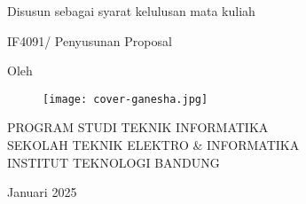 \clearpage
\pagestyle{empty}

\begin{center}
    \smallskip

    \Large \bfseries \MakeUppercase{\thetitle}
    \vfill


    \large Disusun sebagai syarat kelulusan mata kuliah

    \large IF4091/ Penyusunan Proposal
    \vfill

    \large Oleh

    \Large \theauthor

    \vfill
    \begin{figure}[H]
        \centering
        \texttt{[image: cover-ganesha.jpg]}
    \end{figure}
    \vfill

    \large
    \uppercase{
        Program Studi Teknik Informatika \\
        Sekolah Teknik Elektro \& Informatika \\
        Institut Teknologi Bandung
    }

    Januari 2025

\end{center}

\clearpage
